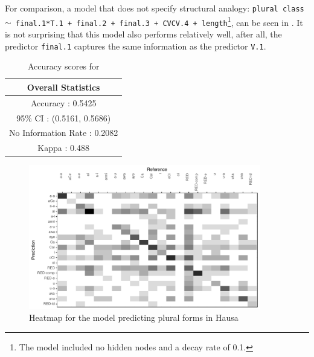 For comparison, a model that does not specify structural analogy: \texttt{plural class $\sim$ final.1*T.1 + final.2 + final.3 + CVCV.4 + length}\footnote{The model included no hidden nodes and a decay rate of 0.1.}, can be seen in . It is not surprising that this model also performs relatively well, after all, the predictor \texttt{final.1} captures the same information as the predictor \texttt{V.1}.
\begin{table}%
  \centering
  \begin{tabular}{rl}
    \toprule
    \multicolumn{2}{c}{Overall Statistics}                                         \\
    \midrule
    \multicolumn{2}{c}{Accuracy : 0.5425}                                          \\
    \multicolumn{2}{c}{95\% CI : (0.5161, 0.5686)}                                  \\
    \multicolumn{2}{c}{No Information Rate : 0.2082}                               \\
    \multicolumn{2}{c}{Kappa : 0.488}                                             \\
    \bottomrule
  \end{tabular}
  \caption{Accuracy scores for }\label{tab:class-hausa-stats}
\end{table}

\begin{figure}%
  \includegraphics[width=0.9\textwidth]{./figures/hausa/plurals-cm.pdf}
  \caption{Heatmap for the model predicting plural forms in Hausa}\label{fig:class-hausa-cm}
\end{figure}


